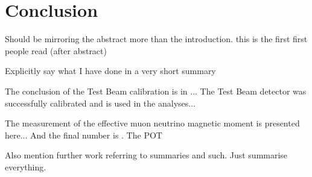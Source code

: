 \chapter{Conclusion}\label{sec:Conclusion}

Should be mirroring the abstract more than the introduction. this is the first first people read (after abstract)

Explicitly say what I have done in a very short summary

The conclusion of the Test Beam calibration is in ... The Test Beam detector was successfully calibrated and is used in the analyses...

The measurement of the effective muon neutrino magnetic moment is presented here... And the final number is . The POT

Also mention further work referring to summaries and such. Just summarise everything.